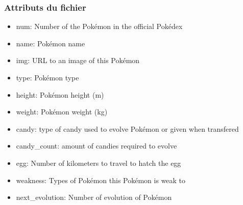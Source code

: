\documentclass[svgnames,11pt]{beamer}
\begin{document}
\begin{frame}
    \frametitle{Attributs du fichier}

    \begin{itemize}
        \item num: Number of the Pokémon in the official Pokédex
        \item name: Pokémon name
        \item img: URL to an image of this Pokémon
        \item type: Pokémon type
        \item height: Pokémon height (m)
        \item weight: Pokémon weight (kg)
        \item candy: type of candy used to evolve Pokémon or given when transfered
        \item candy\_count: amount of candies required to evolve
        \item egg: Number of kilometers to travel to hatch the egg
        \item weakness: Types of Pokémon this Pokémon is weak to
        \item next\_evolution: Number of evolution of Pokémon
    \end{itemize}

\end{frame}
\end{document}
